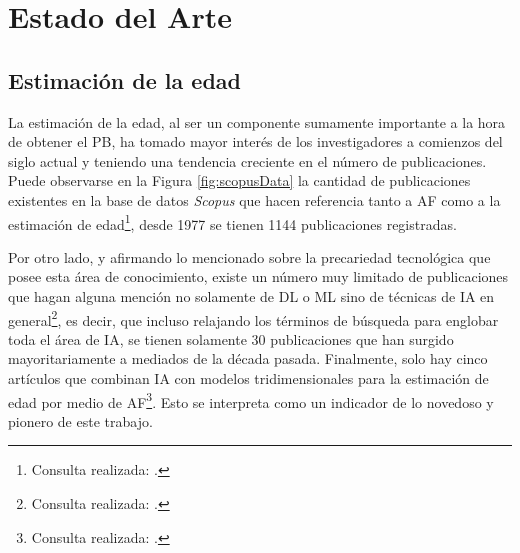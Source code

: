 \chapter{Estado del Arte}

\section{Estimación de la edad}
La estimación de la edad, al ser un componente sumamente importante a la hora de obtener el PB, ha tomado mayor interés de los investigadores a comienzos del siglo actual y teniendo una tendencia creciente en el número de publicaciones. Puede observarse en la Figura \ref{fig:scopusData} la cantidad de publicaciones existentes en la base de datos \textit{Scopus} que hacen referencia tanto a AF como a la estimación de edad\footnote{Consulta realizada: .}, desde 1977 se tienen 1144 publicaciones registradas. 

Por otro lado, y afirmando lo mencionado sobre la precariedad tecnológica que posee esta área de conocimiento, existe un número muy limitado de publicaciones que hagan alguna mención no solamente de DL o ML sino de técnicas de IA en general\footnote{Consulta realizada: .}, es decir, que incluso relajando los términos de búsqueda para englobar toda el área de IA, se tienen solamente 30 publicaciones que han surgido mayoritariamente a mediados de la década pasada. Finalmente, solo hay cinco artículos que combinan IA con modelos tridimensionales para la estimación de edad por medio de AF\footnote{Consulta realizada: .}. Esto se interpreta como un indicador de lo novedoso y pionero de este trabajo.

